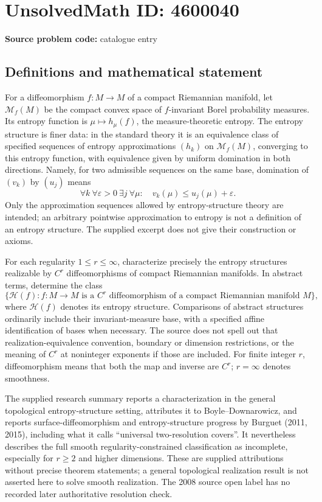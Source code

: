 \documentclass[11pt]{article}
\begin{document}
\section*{UnsolvedMath ID: 4600040}
\textbf{Source problem code:} catalogue entry
\subsection{Definitions and mathematical statement}
For a diffeomorphism \(f:M\to M\) of a compact Riemannian manifold, let \(\mathcal M_f(M)\) be the compact convex space of \(f\)-invariant Borel probability measures. Its entropy function is \(\mu\mapsto h_\mu(f)\), the measure-theoretic entropy. The entropy structure is finer data: in the standard theory it is an equivalence class of specified sequences of entropy approximations \((h_k)\) on \(\mathcal M_f(M)\), converging to this entropy function, with equivalence given by uniform domination in both directions. Namely, for two admissible sequences on the same base, domination of \((v_k)\) by \((u_j)\) means
\[
 \forall k\ \forall\varepsilon>0\ \exists j\ \forall\mu:
 \quad v_k(\mu)\le u_j(\mu)+\varepsilon.
\]
Only the approximation sequences allowed by entropy-structure theory are intended; an arbitrary pointwise approximation to entropy is not a definition of an entropy structure. The supplied excerpt does not give their construction or axioms.

For each regularity \(1\le r\le\infty\), characterize precisely the entropy structures realizable by \(C^r\) diffeomorphisms of compact Riemannian manifolds. In abstract terms, determine the class
\[
 \{\mathcal H(f): f:M\to M\text{ is a }C^r\text{ diffeomorphism of a compact Riemannian manifold }M\},
\]
where \(\mathcal H(f)\) denotes its entropy structure. Comparisons of abstract structures ordinarily include their invariant-measure base, with a specified affine identification of bases when necessary. The source does not spell out that realization-equivalence convention, boundary or dimension restrictions, or the meaning of \(C^r\) at noninteger exponents if those are included. For finite integer \(r\), diffeomorphism means that both the map and inverse are \(C^r\); \(r=\infty\) denotes smoothness.

The supplied research summary reports a characterization in the general topological entropy-structure setting, attributes it to Boyle--Downarowicz, and reports surface-diffeomorphism and entropy-structure progress by Burguet (2011, 2015), including what it calls ``universal two-resolution covers''. It nevertheless describes the full smooth regularity-constrained classification as incomplete, especially for \(r\ge2\) and higher dimensions. These are supplied attributions without precise theorem statements; a general topological realization result is not asserted here to solve smooth realization. The 2008 source open label has no recorded later authoritative resolution check.
\end{document}

